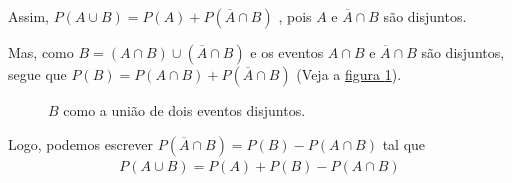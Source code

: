 Assim, \(P(A\cup B)=P(A)+P(\overline{A}\cap B)\) , pois \(A\) e \(\overline{A}\cap B\) são disjuntos.

Mas, como \(B=(A\cap B) \cup (\overline{A}\cap B)\) e os eventos \(A\cap B\) e \(\overline{A}\cap B\) são disjuntos, segue que \(P(B)=P(A\cap B)+P(\overline{A}\cap B)\) (Veja a \hyperref[eventosdijuntos3]{figura \ref{eventosdijuntos3}}).

\begin{figure}[H]
\centering

\caption{\(B\) como a união de dois eventos disjuntos.}
\label{eventosdijuntos3}
\end{figure}

Logo, podemos escrever \(P(\overline{A}\cap B)=P(B)-P(A\cap B)\) tal que
\begin{equation*}
\begin{split}P(A\cup B)=P(A)+P(B)-P(A\cap B)\end{split}
\end{equation*}


